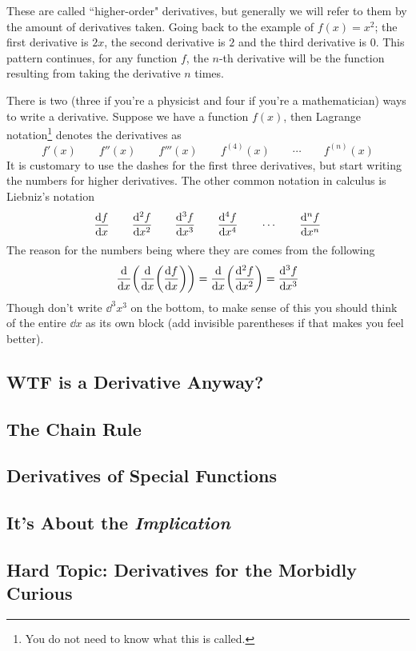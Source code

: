 These are called ``higher-order" derivatives, but generally we will refer to them by the amount of derivatives taken. Going back to the example of $f(x) = x^2$; the first derivative is $2x$, the second derivative is $2$ and the third derivative is $0$. This pattern continues, for any function $f$, the $n$-th derivative will be the function resulting from taking the derivative $n$ times.

There is two (three if you're a physicist and four if you're a mathematician) ways to write a derivative. Suppose we have a function $f(x)$, then Lagrange notation\footnote{You do not need to know what this is called.} denotes the derivatives as
\[ f'(x) \qquad f''(x) \qquad f'''(x) \qquad f^{(4)}(x) \qquad \cdots \qquad f^{(n)}(x)\]
It is customary to use the dashes for the first three derivatives, but start writing the numbers for higher derivatives. The other common notation in calculus is Liebniz's notation
\[ \dv{f}{x} \qquad \dv[2]{f}{x} \qquad \dv[3]{f}{x} \qquad \dv[4]{f}{x} \qquad \cdots \qquad \dv[n]{f}{x} \]
The reason for the numbers being where they are comes from the following
\[ \dv{x} \qty( \dv{x} \qty( \dv{f}{x} )) = \dv{x} \qty( \dv[2]{f}{x} ) = \dv[3]{f}{x} \]
Though don't write $\dd^3x^3$ on the bottom, to make sense of this you should think of the entire $\dd x$ as its own block (add invisible parentheses if that makes you feel better).



\newpage 
\subsection{WTF is a Derivative Anyway?}

\subsection{The Chain Rule}
\subsection{Derivatives of Special Functions}
\subsection{It's About the \emph{Implication}}
\subsection{Hard Topic: Derivatives for the Morbidly Curious}